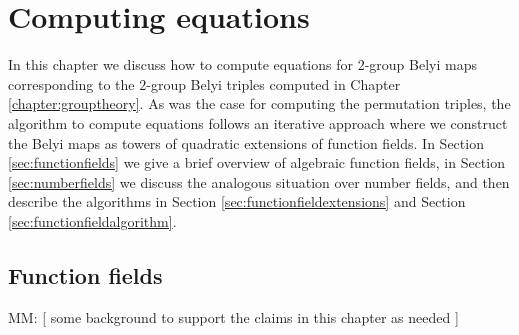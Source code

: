 \documentclass{dcthesis}
\newcommand{\mm}[1]{{\color{blue} \sf MM: [#1]}}
\numberwithin{equation}{section}
\theoremstyle{definition}
\theoremstyle{remark}
\begin{document}
\chapter{Computing equations}{\label{chapter:equations}
  In this chapter we discuss how to compute
  equations for $2$-group Belyi maps
  corresponding to the $2$-group Belyi triples
  computed in Chapter
  \ref{chapter:grouptheory}.
  As was the case for computing the permutation
  triples,
  the algorithm to compute equations follows an
  iterative approach where we
  construct the Belyi maps
  as towers of quadratic extensions
  of function fields.
  In
  Section \ref{sec:functionfields}
  we give a brief overview of
  algebraic function fields,
  in Section
  \ref{sec:numberfields}
  we discuss the analogous situation
  over number fields,
  and then describe the algorithms
  in
  Section
  \ref{sec:functionfieldextensions}
  and Section
  \ref{sec:functionfieldalgorithm}.
  \section{Function fields}{\label{sec:functionfields}
    \mm{
      some background to support the
      claims in this chapter as needed
    }
  }
}
\end{document}
